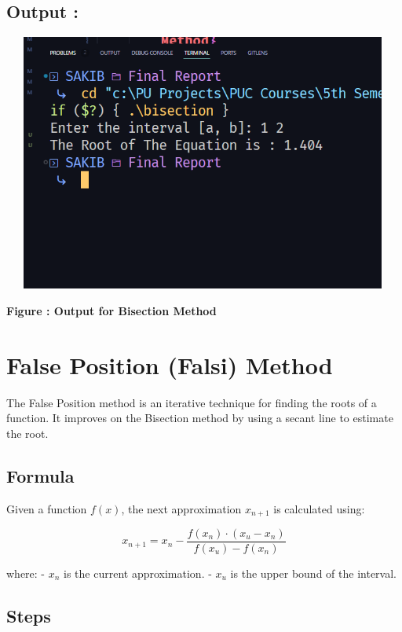 \documentclass{scrreprt}
\begin{document}
\subsection*{Output : }
\begin{center}
    {\includegraphics[width=500px, height=320px]{bisection_output.png}}
    \parbox{0.8\textwidth}{ 
        \centering
        \textbf{Figure : Output for Bisection Method}
    }
\end{center}
\section*{False Position (Falsi) Method}

The False Position method is an iterative technique for finding the roots of a function. It improves on the Bisection method by using a secant line to estimate the root.

\subsection*{Formula}

Given a function \( f(x) \), the next approximation \( x_{n+1} \) is calculated using:

\begin{equation}
x_{n+1} = x_n - \frac{f(x_n) \cdot (x_u - x_n)}{f(x_u) - f(x_n)}
\end{equation}

where:
- \( x_n \) is the current approximation.
- \( x_u \) is the upper bound of the interval.

\subsection*{Steps}
\end{document}
